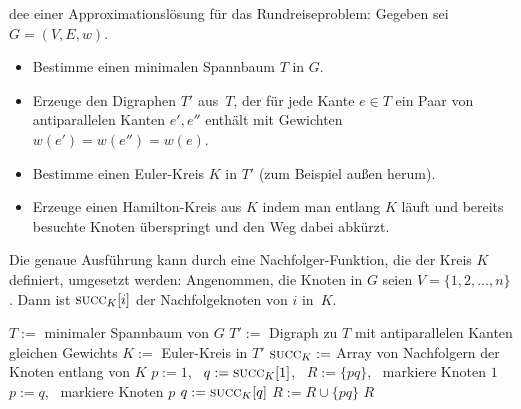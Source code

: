 \begin{bem} 
dee einer Approximationslösung für das Rundreiseproblem: Gegeben sei $G=(V,E,w)$.
\begin{itemize}
 \item Bestimme einen minimalen Spannbaum $T$ in $G$.
 \item Erzeuge den Digraphen $T'$ aus~$T$, der für jede Kante $e \in T$ ein Paar von antiparallelen Kanten $e',e''$ enthält mit Gewichten $w(e')=w(e'')=w(e)$.
 \item Bestimme einen Euler-Kreis $K$ in $T'$ (zum Beispiel \glqq au\ss en herum\grqq).
 \item Erzeuge einen Hamilton-Kreis aus $K$ indem man entlang $K$ läuft und bereits besuchte Knoten überspringt und den Weg dabei \glqq abkürzt\grqq.
\end{itemize}
Die genaue Ausführung kann durch eine Nachfolger-Funktion, die der Kreis $K$ definiert, umgesetzt werden:
Angenommen, die Knoten in $G$ seien $V = \{1,2,\ldots,n\}$. Dann ist $\mathop{\text{\textsc{succ}}}_K[i]$ der Nachfolgeknoten von $i$ in~$K$.
\end{bem}


\begin{algorithm}[H]
\caption{$\cc{Rundreise-MSB}(G)$}
\begin{algorithmic}[1]
 \STATE $T :=$ minimaler Spannbaum von $G$
 \STATE $T' :=$ Digraph zu $T$ mit antiparallelen Kanten gleichen Gewichts
 \STATE $K :=$ Euler-Kreis in $T'$
 \STATE $\mathop{\text{\textsc{succ}}}_K :=$ Array von Nachfolgern der Knoten entlang von $K$
 \STATE $p := 1$, \ $q := \mathop{\text{\textsc{succ}}}_K[1]$, \ $R := \{pq\}$, \ markiere Knoten $1$
  \STATE $p := q$, \ markiere Knoten $p$
  \STATE {}
   \STATE $q := \mathop{\text{\textsc{succ}}}_K[q]$
  \ENDWHILE
  \STATE $R := R \cup \{pq\}$
 \ENDWHILE
 \RETURN $R$
\end{algorithmic}
\end{algorithm}


